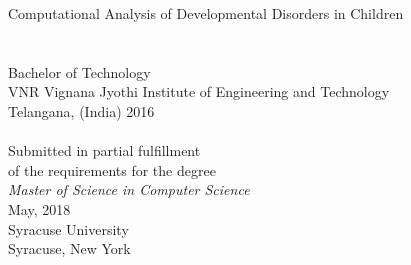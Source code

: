 %
%
%
%

\begin{titlepage}
\begin{center}
\vspace*{0.2cm}
\noindent\makebox[\linewidth]{\rule{\textwidth}{0.3pt}}
{\huge %
Computational Analysis of Developmental Disorders in Children\\[0.4cm]
}
\noindent\makebox[\linewidth]{\rule{\textwidth}{0.3pt}}\\ %
\vspace{0.5cm}
\vspace{0.5cm}
\\[6pt]
Bachelor of Technology\\
VNR Vignana Jyothi Institute of Engineering and Technology\\
Telangana, (India) 2016\\
\vspace{1.3cm}
\\[6pt]
Submitted in partial fulfillment\\
of the requirements for the degree\\
\emph{Master of Science in Computer Science}\\
May, 2018\\
Syracuse University\\
Syracuse, New York

\end{center}
\end{titlepage}

